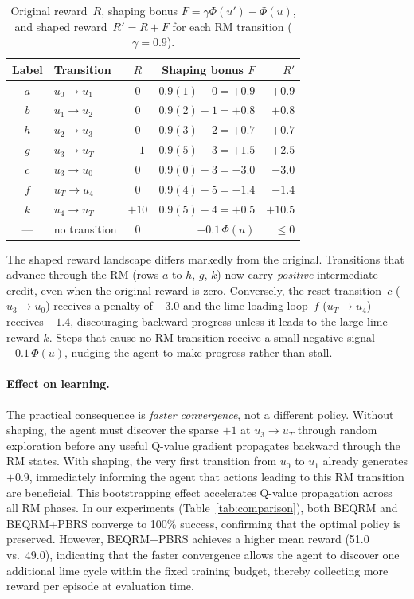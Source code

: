 \documentclass[11pt]{article}
\begin{document}
\begin{table}[ht]
\centering\small
\begin{tabular}{clcrr}
\toprule
\textbf{Label} & \textbf{Transition} & $R$ & \textbf{Shaping bonus} $F$ & $R'$ \\
\midrule
$a$ & $u_0 \to u_1$ & $0$ & $0.9(1) - 0 = +0.9$ & $+0.9$ \\
$b$ & $u_1 \to u_2$ & $0$ & $0.9(2) - 1 = +0.8$ & $+0.8$ \\
$h$ & $u_2 \to u_3$ & $0$ & $0.9(3) - 2 = +0.7$ & $+0.7$ \\
$g$ & $u_3 \to u_T$ & $+1$ & $0.9(5) - 3 = +1.5$ & $+2.5$ \\
$c$ & $u_3 \to u_0$ & $0$ & $0.9(0) - 3 = -3.0$ & $-3.0$ \\
$f$ & $u_T \to u_4$ & $0$ & $0.9(4) - 5 = -1.4$ & $-1.4$ \\
$k$ & $u_4 \to u_T$ & $+10$ & $0.9(5) - 4 = +0.5$ & $+10.5$ \\
--- & no transition & $0$ & $-0.1\,\Phi(u)$ & $\leq 0$ \\
\bottomrule
\end{tabular}
\caption{Original reward~$R$, shaping bonus $F = \gamma\Phi(u') - \Phi(u)$, and shaped reward~$R' = R + F$ for each RM transition ($\gamma = 0.9$).}
\label{tab:shaped_rewards}
\end{table}

The shaped reward landscape differs markedly from the original.
Transitions that advance through the RM (rows $a$ to $h$, $g$, $k$) now carry \emph{positive} intermediate credit, even when the original reward is zero.
Conversely, the reset transition~$c$ ($u_3 \to u_0$) receives a penalty of $-3.0$ and the lime-loading loop~$f$ ($u_T \to u_4$) receives $-1.4$, discouraging backward progress unless it leads to the large lime reward $k$.
Steps that cause no RM transition receive a small negative signal $-0.1\,\Phi(u)$, nudging the agent to make progress rather than stall.

\paragraph{Effect on learning.}
The practical consequence is \emph{faster convergence}, not a different policy.
Without shaping, the agent must discover the sparse $+1$ at $u_3 \to u_T$ through random exploration before any useful Q-value gradient propagates backward through the RM states.
With shaping, the very first transition from $u_0$ to $u_1$ already generates $+0.9$, immediately informing the agent that actions leading to this RM transition are beneficial.
This bootstrapping effect accelerates Q-value propagation across all RM phases.
In our experiments (Table~\ref{tab:comparison}), both BEQRM and BEQRM+PBRS converge to 100\% success, confirming that the optimal policy is preserved. However, BEQRM+PBRS achieves a higher mean reward (51.0 vs.\ 49.0), indicating that the faster convergence allows the agent to discover one additional lime cycle within the fixed training budget, thereby collecting more reward per episode at evaluation time.
\end{document}
